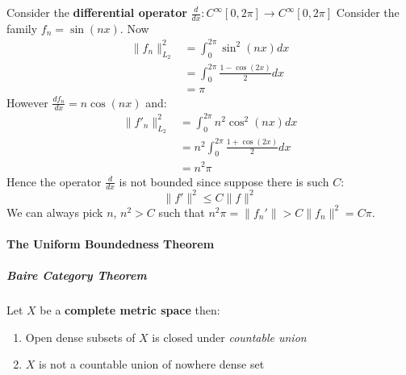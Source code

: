 \begin{example}Consider the \textbf{differential operator} $\frac{d}{dx}: C^{\infty}[0,2\pi]\to C^{\infty}[0,2\pi]$
Consider the family $f_n=\sin(nx)$. Now
\begin{equation}
\begin{aligned}
\|f_n\|^2_{L_2} &=\int_0^{2\pi}\sin^2(nx)dx \\
&=\int_0^{2\pi}\frac{1-\cos(2x)}{2}dx \\
&=\pi
\end{aligned}
\end{equation}
However $\frac{df_n}{dx}=n\cos(nx)$ and:
\begin{equation}
\begin{aligned}
\|f'_n\|^2_{L_2}&= \int_0^{2\pi} n^2\cos^2(nx)dx \\
&=n^2\int_0^{2\pi}\frac{1+\cos(2x)}{2} dx \\
&= n^2\pi
\end{aligned}
\end{equation}
Hence the operator $\frac{d}{dx}$ is not bounded since suppose there is such $C$:
\begin{equation}
\|f'\|^2 \leq C\|f\|^2
\end{equation}
We can always pick $n$, $n^2 >C$ such that $n^2\pi =\|f_n'\|>C\|f_n\|^2=C\pi$.

\end{example}\paragraph{The Uniform Boundedness Theorem}

\subparagraph{Baire Category Theorem}

\begin{theorem}Let $X$ be a \textbf{complete metric space} then:

\begin{enumerate}
\item Open dense subsets of $X$ is closed under \textit{countable union}
\item $X$ is not a countable union of nowhere dense set
\end{enumerate}

\end{theorem}